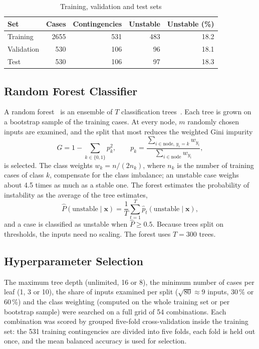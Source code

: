 \documentclass[conference]{IEEEtran}
\begin{document}
\begin{table}[t]
\caption{Training, validation and test sets}
\label{tab:split}
\centering
\begin{tabular}{lrrrr}
\toprule
Set & Cases & Contingencies & Unstable & Unstable (\%) \\
\midrule
Training   & 2655 & 531 & 483 & 18.2 \\
Validation & 530  & 106 & 96  & 18.1 \\
Test       & 530  & 106 & 97  & 18.3 \\
\bottomrule
\end{tabular}
\end{table}

\subsection{Random Forest Classifier}
A random forest~\cite{breiman2001} is an ensemble of $T$ classification trees~\cite{breiman1984}. Each tree is grown
on a bootstrap sample of the training cases. At every node, $m$ randomly chosen inputs are examined, and the split
that most reduces the weighted Gini impurity
\begin{equation}
  G = 1 - \sum_{k \in \{0,1\}} p_k^2, \qquad p_k = \frac{\sum_{i \in \text{node},\, y_i = k} w_{y_i}}{\sum_{i \in \text{node}} w_{y_i}},
\end{equation}
is selected. The class weights $w_k = n/(2 n_k)$, where $n_k$ is the number of training cases of class $k$, compensate
for the class imbalance; an unstable case weighs about 4.5 times as much as a stable one. The forest estimates the
probability of instability as the average of the tree estimates,
\begin{equation}
  \hat{P}(\text{unstable} \mid \mathbf{x}) = \frac{1}{T} \sum_{t=1}^{T} \hat{p}_t(\text{unstable} \mid \mathbf{x}),
\end{equation}
and a case is classified as unstable when $\hat{P} \ge 0.5$. Because trees split on thresholds, the inputs need no
scaling. The forest uses $T = 300$ trees.

\subsection{Hyperparameter Selection}
The maximum tree depth (unlimited, 16 or 8), the minimum number of cases per leaf (1, 3 or 10), the share of inputs
examined per split ($\sqrt{80} \approx 9$ inputs, 30\,\% or 60\,\%) and the class weighting (computed on the whole
training set or per bootstrap sample) were searched on a full grid of 54 combinations. Each combination was scored by
grouped five-fold cross-validation inside the training set: the 531 training contingencies are divided into five
folds, each fold is held out once, and the mean balanced accuracy is used for selection.
\end{document}
